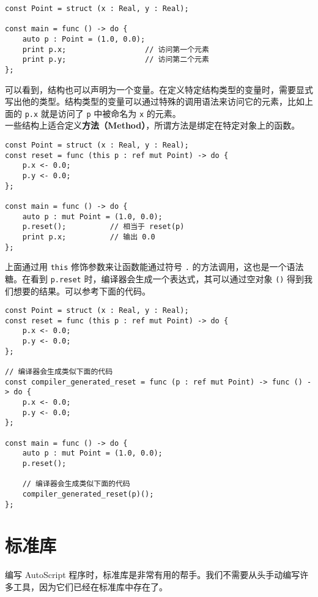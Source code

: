 \begin{lstlisting}
const Point = struct (x : Real, y : Real);

const main = func () -> do {
    auto p : Point = (1.0, 0.0);
    print p.x;					// 访问第一个元素
    print p.y;					// 访问第二个元素
};
\end{lstlisting}

可以看到，结构也可以声明为一个变量。在定义特定结构类型的变量时，需要显式写出他的类型。结构类型的变量可以通过特殊的调用语法来访问它的元素，比如上面的 \lstinline!p.x! 就是访问了 \lstinline!p! 中被命名为 \lstinline!x! 的元素。 \\

一些结构上适合定义\textbf{方法（Method）}，所谓方法是绑定在特定对象上的函数。

\begin{lstlisting}
const Point = struct (x : Real, y : Real);
const reset = func (this p : ref mut Point) -> do {
    p.x <- 0.0;
    p.y <- 0.0;
};

const main = func () -> do {
    auto p : mut Point = (1.0, 0.0);
    p.reset();			// 相当于 reset(p)
    print p.x;          // 输出 0.0
};
\end{lstlisting}

上面通过用 \lstinline!this! 修饰参数来让函数能通过符号 \lstinline!.! 的方法调用，这也是一个语法糖。在看到 \lstinline!p.reset! 时，编译器会生成一个表达式，其可以通过空对象 \lstinline!()! 得到我们想要的结果。可以参考下面的代码。

\begin{lstlisting}
const Point = struct (x : Real, y : Real);
const reset = func (this p : ref mut Point) -> do {
	p.x <- 0.0;
	p.y <- 0.0;
};

// 编译器会生成类似下面的代码
const compiler_generated_reset = func (p : ref mut Point) -> func () -> do {
	p.x <- 0.0;
	p.y <- 0.0;
};

const main = func () -> do {
	auto p : mut Point = (1.0, 0.0);
	p.reset();
	
	// 编译器会生成类似下面的代码
	compiler_generated_reset(p)();
};
\end{lstlisting}


\section{标准库}

编写 AutoScript 程序时，标准库是非常有用的帮手。我们不需要从头手动编写许多工具，因为它们已经在标准库中存在了。 \\

